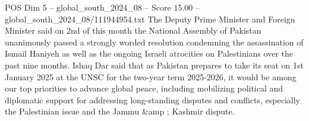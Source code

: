 \begin{textsample}{POS Dim 5 – global\_south\_2024\_08 – Score 15.00 – global\_south\_2024\_08/111944954.txt}
The Deputy Prime Minister and Foreign Minister said on 2nd of this month the National Assembly of Pakistan unanimously passed a strongly worded resolution condemning the assassination of Ismail Haniyeh as well as the ongoing Israeli atrocities on Palestinians over the past nine months.
Ishaq Dar said that as Pakistan prepares to take its seat on 1st January 2025 at the UNSC for the two-year term 2025-2026, it would be among our top priorities to advance global peace, including mobilizing political and diplomatic support for addressing long-standing disputes and conflicts, especially the Palestinian issue and the Jammu \&amp ; Kashmir dispute.

\end{textsample}
